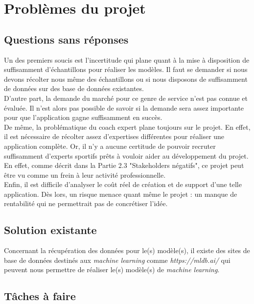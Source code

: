 
\chapter{Problèmes du projet}

\section{Questions sans réponses}

Un des premiers soucis est l'incertitude qui plane quant à la mise à disposition de suffisamment d'échantillons pour réaliser les modèles. Il faut se demander si nous devons récolter nous même des échantillons ou si nous disposons de suffisamment de données sur des base de données existantes.\\

D'autre part, la demande du marché pour ce genre de service n'est pas connue et évaluée. Il n'est alors pas possible de savoir si la demande sera assez importante pour que l'application gagne suffisamment en succès.\\

De même, la problématique du coach expert plane toujours sur le projet. En effet, il est nécessaire de récolter assez d'expertises différentes pour réaliser une application complète. Or, il n'y a aucune certitude de pouvoir recruter suffisamment d'experts sportifs prêts à vouloir aider au développement du projet. En effet, comme décrit dans la Partie 2.3 "Stakeholders négatifs", ce projet peut être vu comme un frein à leur activité professionnelle.\\ 

Enfin, il est difficile d'analyser le coût réel de création et de support d'une telle application. Dès lors, un risque menace quant même le projet : un manque de rentabilité qui ne permettrait pas de concrétiser l'idée.

\section{Solution existante}

Concernant la récupération des données pour le(s) modèle(s), il existe des sites de base de données destinés aux \textit{machine learning} comme \textit{https://mldb.ai/} qui peuvent nous permettre de réaliser le(s) modèle(s) de \textit{machine learning}.

\section{Tâches à faire}

